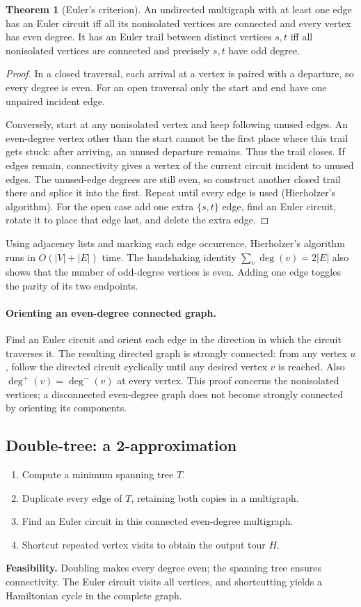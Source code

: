 \documentclass[10pt]{article}
\theoremstyle{definition}
\newtheorem{theorem}[definition]{Theorem}
\begin{document}
\begin{theorem}[Euler's criterion]
An undirected multigraph with at least one edge has an Euler circuit iff
all its nonisolated vertices are connected and every vertex has even degree.
It has an Euler trail between distinct vertices $s,t$ iff all nonisolated
vertices are connected and precisely $s,t$ have odd degree.
\end{theorem}
\begin{proof}
In a closed traversal, each arrival at a vertex is paired with a departure,
so every degree is even.  For an open traversal only the start and end have
one unpaired incident edge.

Conversely, start at any nonisolated vertex and keep following unused edges.
An even-degree vertex other than the start cannot be the first place where
this trail gets stuck: after arriving, an unused departure remains.  Thus
the trail closes.  If edges remain, connectivity gives a vertex of the
current circuit incident to unused edges.  The unused-edge degrees are
still even, so construct another closed trail there and splice it into the
first.  Repeat until every edge is used (Hierholzer's algorithm).
For the open case add one extra $\{s,t\}$ edge, find an Euler circuit,
rotate it to place that edge last, and delete the extra edge.
\end{proof}
Using adjacency lists and marking each edge occurrence, Hierholzer's
algorithm runs in $O(|V|+|E|)$ time.  The handshaking identity
$\sum_v\deg(v)=2|E|$ also shows that the number of odd-degree vertices is
even.  Adding one edge toggles the parity of its two endpoints.

\paragraph{Orienting an even-degree connected graph.}
Find an Euler circuit and orient each edge in the direction in which the
circuit traverses it.  The resulting directed graph is strongly connected:
from any vertex $u$, follow the directed circuit cyclically until any desired
vertex $v$ is reached.  Also $\deg^+(v)=\deg^-(v)$ at every vertex.
This proof concerns the nonisolated vertices; a disconnected even-degree
graph does not become strongly connected by orienting its components.

\subsection{Double-tree: a 2-approximation}\label{tsp:doubletree}
\begin{enumerate}
  \item Compute a minimum spanning tree $T$.
  \item Duplicate every edge of $T$, retaining both copies in a multigraph.
  \item Find an Euler circuit in this connected even-degree multigraph.
  \item Shortcut repeated vertex visits to obtain the output tour $H$.
\end{enumerate}
\textbf{Feasibility.} Doubling makes every degree even; the spanning tree
ensures connectivity.  The Euler circuit visits all vertices, and
shortcutting yields a Hamiltonian cycle in the complete graph.
\end{document}
